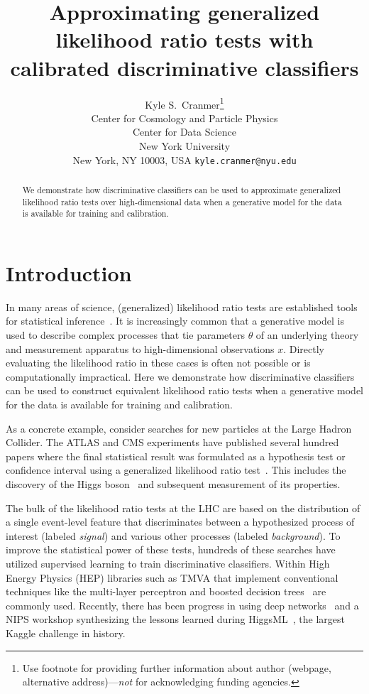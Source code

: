 \documentclass{article} %
\title{Approximating generalized likelihood ratio tests with calibrated discriminative classifiers}
\author{
Kyle S.~Cranmer\thanks{ Use footnote for providing further information
about author (webpage, alternative address)---\emph{not} for acknowledging
funding agencies.} \\
Center for Cosmology and Particle Physics\\
       Center for Data Science\\
       New York University \\
       New York, NY 10003, USA
\texttt{kyle.cranmer@nyu.edu} \\
}
\begin{document}
\maketitle

\begin{abstract}
We demonstrate how discriminative classifiers can be used to approximate 
generalized likelihood ratio tests over high-dimensional data when a generative model 
for the data is available for training and calibration.  
\end{abstract}


\section{Introduction}


In many areas of science, (generalized) likelihood ratio tests  are established tools for statistical inference~\cite{Wilks1938}. 
It is increasingly common that a generative model is used to describe complex processes that tie 
parameters $\theta$ of an underlying theory and measurement apparatus to high-dimensional observations $x$. 
Directly evaluating the likelihood ratio in these cases is often not possible or is computationally impractical. Here we demonstrate how discriminative classifiers can be used to construct equivalent likelihood ratio tests when 
a generative model for the data is available for training and calibration.  

As a concrete example, consider searches for new particles at the Large Hadron Collider. 
The ATLAS and CMS experiments have published several hundred papers where the 
final statistical result was formulated as a hypothesis test or confidence interval 
using a generalized likelihood ratio test~\cite{Cowan:2010js}. This includes
the discovery of the Higgs boson~\cite{Aad:2012tfa,Chatrchyan:2012ufa} and 
subsequent measurement of its properties.  

The bulk of the likelihood ratio tests at the LHC are based on the distribution of a single event-level feature
that discriminates between a hypothesized process of interest (labeled \textit{signal}) and various other processes 
(labeled \textit{background}). To improve the statistical power of these tests, hundreds of these searches have utilized supervised learning to train discriminative classifiers. Within High Energy Physics (HEP) libraries such as TMVA that implement conventional techniques like the multi-layer perceptron and boosted decision trees~\cite{Hocker:2007ht} are commonly used. Recently, there has been progress in using deep networks~\cite{Baldi:2014kfa} and a NIPS workshop synthesizing the lessons learned during HiggsML~\cite{HepML}, the largest Kaggle challenge in history. 
\end{document}
